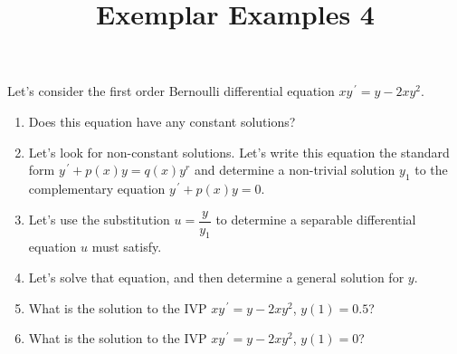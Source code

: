 \documentclass{ximera}
\begin{document}
\begin{abstract}
 \end{abstract}

    \title{Exemplar Examples 4}
    
    \maketitle

Let's consider the first order Bernoulli differential equation $xy^{\,\prime}=y-2xy^2$.

\begin{enumerate}

\item Does this equation have any constant solutions? 


\vfill

\item Let's look for non-constant solutions.  Let's write this equation the standard form $y^{\,\prime}+p(x)y=q(x)y^r$ and determine a non-trivial solution $y_1$ to the complementary equation $y^{\,\prime}+p(x)y=0$.

\vfill
\vfill


\item Let's use the substitution $u=\dfrac{y}{y_1}$ to determine a separable differential equation $u$ must satisfy.



\vfill
\vfill
\vfill

\item Let's solve that equation, and then determine a general solution for $y$.



\vfill
\vfill


\newpage

\item What is the solution to the IVP $xy^{\,\prime}=y-2xy^2$, $y(1)=0.5$?


\vfill


\item What is the solution to the IVP $xy^{\,\prime}=y-2xy^2$, $y(1)=0$?

\vfill



\end{enumerate}
\end{document}
